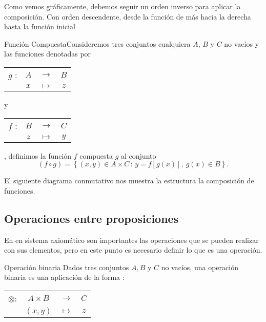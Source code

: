 Como vemos gráficamente, debemos seguir un orden inverso para aplicar
la composición. Con orden descendente, desde la función de más hacia
la derecha hasta la función inicial

\begin{definicionn}{Función Compuesta}Consideremos tres conjuntos
cualquiera $A$, $B$ y $C$ no vacíos y las funciones denotadas por
\begin{tabular}{cccc}
$g$ : & $A$ & $\rightarrow$ & %
$B$%
\tabularnewline
 & $x$ & $\mapsto$ & $z$\tabularnewline
\end{tabular} y %
\begin{tabular}{cccc}
$f$ : & $B$ & $\rightarrow$ & %
$C$%
\tabularnewline
 & $z$ & $\mapsto$ & $y$\tabularnewline
\end{tabular}, definimos la función $f$ compuesta $g$ al conjunto 
\[
\left(f\circ g\right)=\left\{ \left(x,y\right)\in A\times C\,:\, y=f\left[g\left(x\right)\right],\: g\left(x\right)\in B\right\} .
\]


\end{definicionn}

El siguiente diagrama conmutativo nos muestra la estructura la composición
de funciones.

\begin{center}\end{center}


\subsection{\label{sub:Operaciones-entre-proposiciones}Operaciones entre proposiciones}

En en sistema axiomático son importantes las operaciones que se pueden
realizar con sus elementos, pero en este punto es necesario definir
lo que es una operación.

\begin{definicionn}{Operación binaria} Dados tres conjuntos $A,B$
y $C$ no vacíos, una operación binaria es una aplicación de la forma
:

\begin{center}%
\begin{tabular}{cccc}
$\otimes$: & $A\times B$ & $\rightarrow$ & %
$C$%
\tabularnewline
 & $\left(x,y\right)$ & $\mapsto$ & $z$\tabularnewline
\end{tabular}\end{center}\vspace{-5pt}\end{definicionn}

